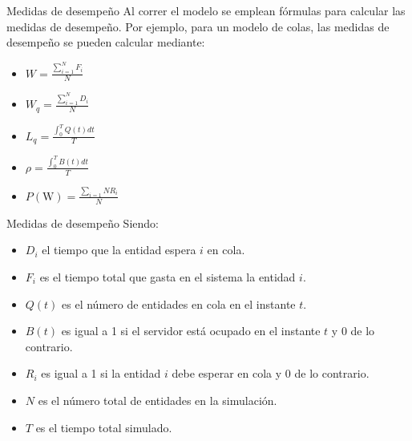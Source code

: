 \begin{frame}{Medidas de desempeño}
    Al correr el modelo se emplean fórmulas para calcular las medidas de desempeño. Por ejemplo, para un modelo de colas, las medidas de desempeño se pueden calcular mediante:

    \begin{itemize}
        \item $W=\frac{\sum_{i=1}^{N}{F_i}}{N}$
        \item $W_q=\frac{\sum_{i=1}^{N}{D_i}}{N}$
        \item $L_q=\frac{\int_{0}^{T}Q(t)dt}{T}$
        \item $\rho=\frac{\int_{0}^{T}B(t)dt}{T}$
        \item $P(\text{W})=\frac{\sum_{i=1}{N}{R_i}}{N}$
    \end{itemize}        
\end{frame}

\begin{frame}{Medidas de desempeño}
    Siendo:
    \begin{itemize}
        \item $D_i$ el tiempo que la entidad espera $i$ en cola.
        \item $F_i$ es el tiempo total que gasta en el sistema la entidad $i$. 
        \item $Q(t)$ es el número de entidades en cola en el instante $t$.
        \item $B(t)$ es igual a 1 si el servidor está ocupado en el instante $t$ y 0 de lo contrario.
        \item $R_i$ es igual a 1 si la entidad $i$ debe esperar en cola y 0 de lo contrario.
        \item $N$ es el número total de entidades en la simulación.
        \item $T$ es el tiempo total simulado.
    \end{itemize}
\end{frame}

